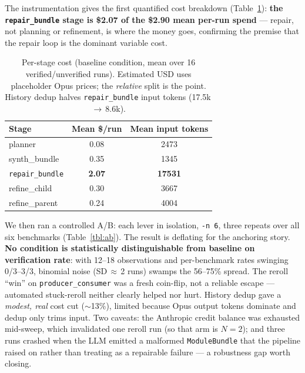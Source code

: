 \documentclass[11pt]{article}
\begin{document}
The instrumentation gives the first quantified cost breakdown
(Table~\ref{tbl:cost}): \textbf{the \texttt{repair\_bundle} stage is \$2.07 of the
\$2.90 mean per-run spend} --- repair, not planning or refinement, is where the
money goes, confirming the premise that the repair loop is the dominant variable
cost.

\begin{table}[t]
\centering\small
\begin{tabular}{lcc}
\toprule
Stage & Mean \$/run & Mean input tokens \\
\midrule
planner       & 0.08 & 2473 \\
synth\_bundle & 0.35 & 1345 \\
\texttt{repair\_bundle} & \textbf{2.07} & \textbf{17531} \\
refine\_child & 0.30 & 3667 \\
refine\_parent& 0.24 & 4004 \\
\bottomrule
\end{tabular}
\caption{Per-stage cost (baseline condition, mean over 16 verified/unverified
runs). Estimated USD uses placeholder Opus prices; the \emph{relative} split is the
point. History dedup halves \texttt{repair\_bundle} input tokens (17.5k\,$\to$\,8.6k).}
\label{tbl:cost}
\end{table}

We then ran a controlled A/B: each lever in isolation, \texttt{-n 6}, three repeats
over all six benchmarks (Table~\ref{tbl:ab}). The result is deflating for the
anchoring story. \textbf{No condition is statistically distinguishable from baseline
on verification rate}: with 12--18 observations and per-benchmark rates swinging
0/3--3/3, binomial noise (SD\,$\approx$\,2 runs) swamps the 56--75\% spread. The
reroll ``win'' on \texttt{producer\_consumer} was a fresh coin-flip, not a reliable
escape --- automated stuck-reroll neither clearly helped nor hurt. History dedup
gave a \emph{modest, real} cost cut ($\sim$13\%), limited because Opus output tokens
dominate and dedup only trims input. Two caveats: the Anthropic credit balance was
exhausted mid-sweep, which invalidated one reroll run (so that arm is $N=2$); and
three runs crashed when the LLM emitted a malformed \texttt{ModuleBundle} that the
pipeline raised on rather than treating as a repairable failure --- a robustness gap
worth closing.
\end{document}

